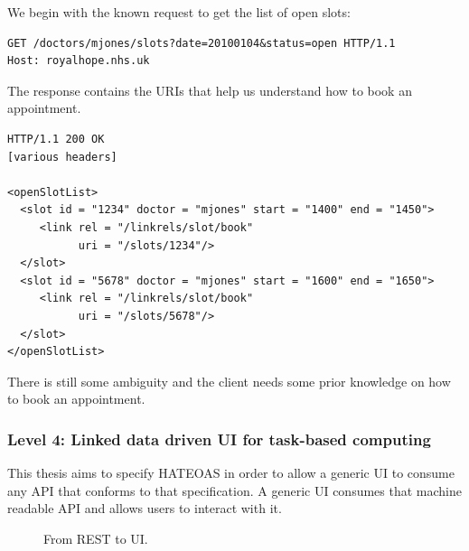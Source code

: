 We begin with the known request to get the list of open slots:

\lstset{language=}
\begin{lstlisting}[caption=Fetching the list of open slots.]
GET /doctors/mjones/slots?date=20100104&status=open HTTP/1.1
Host: royalhope.nhs.uk
\end{lstlisting}

The response contains the URIs that help us understand how to book an appointment.

\lstset{language=}
\begin{lstlisting}[caption=Level 3: The response contains information that helps us book an appointment.]
HTTP/1.1 200 OK
[various headers]

<openSlotList>
  <slot id = "1234" doctor = "mjones" start = "1400" end = "1450">
     <link rel = "/linkrels/slot/book"
           uri = "/slots/1234"/>
  </slot>
  <slot id = "5678" doctor = "mjones" start = "1600" end = "1650">
     <link rel = "/linkrels/slot/book"
           uri = "/slots/5678"/>
  </slot>
</openSlotList>
\end{lstlisting}

There is still some ambiguity and the client needs some prior knowledge on how to book an appointment.

\subsubsection{Level 4: Linked data driven UI for task-based computing}
This thesis aims to specify HATEOAS in order to allow a generic UI to consume any API that conforms to that specification. A generic UI consumes that machine readable API and allows users to interact with it.

\begin{figure}[!htb]
  \caption{From REST to UI.}
\end{figure}

